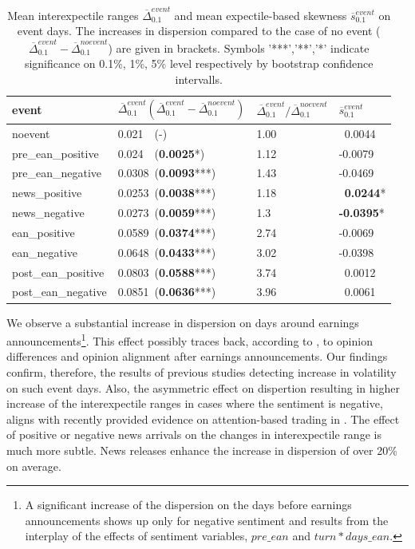 \documentclass[11pt]{article}
\begin{document}
\begin{table}[ht]
\centering
\caption{\label{tab:tabdelt1}Mean interexpectile ranges $\overline\Delta^{event}_{0.1}$ and mean expectile-based skewness $\overline s^{event}_{0.1}$ on event days. The increases in dispersion compared to the case of no event ($\overline\Delta^{event}_{0.1}-\overline\Delta^{noevent}_{0.1}$) are given in brackets.  Symbols '***','**','*' indicate significance on 0.1\%, 1\%, 5\% level respectively by bootstrap confidence intervalls.}
\begin{tabular}{llll}
  \hline
 event & $\overline\Delta_{0.1}^{event} (\overline\Delta_{0.1}^{event} - \overline\Delta_{0.1}^{noevent} )$ & $\overline\Delta_{0.1}^{event} /\overline\Delta_{0.1}^{noevent} $ & $\overline s_{0.1}^{event}$\\
  \hline
noevent & 0.021~~(-) & 1.00 & ~0.0044 \\
pre\_ean\_positive	& 0.024~~({\bf0.0025}*) & 1.12 & -0.0079\\
pre\_ean\_negative	& 0.0308~({\bf0.0093}***) & 1.43 & -0.0469\\
 news\_positive & 0.0253~({\bf0.0038}***) & 1.18 & ~{\bf0.0244}*\\
 news\_negative & 0.0273~({\bf0.0059}***) & 1.3 & {\bf-0.0395}*\\
 ean\_positive & 0.0589~({\bf0.0374}***) & 2.74& -0.0069\\
  ean\_negative & 0.0648~({\bf0.0433}***) & 3.02 & -0.0398\\
  post\_ean\_positive & 0.0803~({\bf0.0588}***) & 3.74& ~0.0012\\
  post\_ean\_negative & 0.0851~({\bf0.0636}***) & 3.96& ~0.0061\\
   \hline
\end{tabular}
\end{table}

We observe a substantial increase in dispersion on days around earnings announcements\footnote{A significant increase of the dispersion on the days before earnings announcements shows up only for negative sentiment and results from the interplay of the effects of sentiment variables, \(pre\_ean\) and \(turn*days\_ean\). }.  This effect possibly traces back, according to \cite{BERKMAN2009}, to opinion differences and opinion alignment after earnings announcements. Our findings confirm, therefore, the results of previous studies detecting increase in volatility on such event days. Also, the asymmetric effect on dispertion resulting in higher increase of the interexpectile ranges in cases where the sentiment is negative, aligns with recently provided evidence on attention-based trading in \cite{barber2022}.  The effect of positive or negative news  arrivals on the changes in interexpectile range is much more subtle. News releases enhance the increase in dispersion of over 20\% on average.
\end{document}
